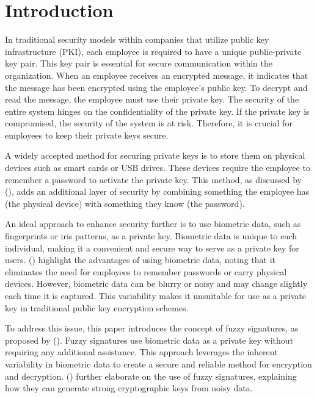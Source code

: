 \documentclass[graybox]{svmult}
\begin{document}
\section{Introduction}
In traditional security models within companies that utilize public key infrastructure (PKI), each employee is required to have a unique public-private key pair. This key pair is essential for secure communication within the organization. When an employee receives an encrypted message, it indicates that the message has been encrypted using the employee’s public key. To decrypt and read the message, the employee must use their private key. The security of the entire system hinges on the confidentiality of the private key. If the private key is compromised, the security of the system is at risk. Therefore, it is crucial for employees to keep their private keys secure.

A widely accepted method for securing private keys is to store them on physical devices such as smart cards or USB drives. These devices require the employee to remember a password to activate the private key. This method, as discussed by \citeauthor{Ellison2000} (\citeyear{Ellison2000}), adds an additional layer of security by combining something the employee has (the physical device) with something they know (the password).

An ideal approach to enhance security further is to use biometric data, such as fingerprints or iris patterns, as a private key. Biometric data is unique to each individual, making it a convenient and secure way to serve as a private key for users. \citeauthor{Connaughton2007} (\citeyear{Connaughton2007}) highlight the advantages of using biometric data, noting that it eliminates the need for employees to remember passwords or carry physical devices. However, biometric data can be blurry or noisy and may change slightly each time it is captured. This variability makes it unsuitable for use as a private key in traditional public key encryption schemes.

To address this issue, this paper introduces the concept of fuzzy signatures, as proposed by \citeauthor{Takahashi2015} (\citeyear{Takahashi2015}). Fuzzy signatures use biometric data as a private key without requiring any additional assistance. This approach leverages the inherent variability in biometric data to create a secure and reliable method for encryption and decryption. \citeauthor{Dodis2008} (\citeyear{Dodis2008}) further elaborate on the use of fuzzy signatures, explaining how they can generate strong cryptographic keys from noisy data.
\end{document}
